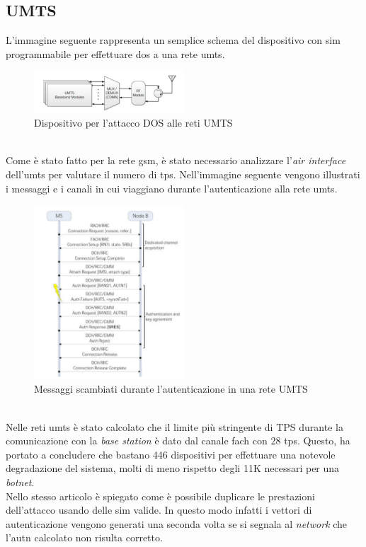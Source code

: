 \subsection{UMTS}
L'immagine seguente rappresenta un semplice schema del dispositivo con \gls{sim} programmabile per effettuare \gls{dos} a una rete \gls{umts}\cite{umts-dos}.
\begin{figure}[h]
    \centering
    \includegraphics[width=0.5\textwidth]{images/umts-dos-device.png}
    \caption{Dispositivo per l'attacco DOS alle reti UMTS\cite{umts-dos}}
\end{figure}\\
Come è stato fatto per la rete \gls{gsm}, è stato necessario analizzare l'\textit{air interface} dell'\gls{umts} per valutare il numero di \gls{tps}.
Nell'immagine seguente vengono illustrati i messaggi e i canali in cui viaggiano durante l'autenticazione alla rete \gls{umts}.
\begin{figure}[h]
    \centering
    \includegraphics[width=0.5\textwidth]{images/umts-air-channel.png}
    \caption{Messaggi scambiati durante l'autenticazione in una rete UMTS\cite{umts-dos}}
\end{figure}\\
Nelle reti \gls{umts} è stato calcolato che il limite più stringente di TPS durante la comunicazione con la \textit{base station} è dato dal canale \gls{fach} con 28 \gls{tps}.
Questo, ha portato a concludere che bastano 446 dispositivi per effettuare una notevole degradazione del sistema, molti di meno rispetto degli 11K necessari per una \textit{botnet}\cite{dos-imsi}.\\
Nello stesso articolo è spiegato come è possibile duplicare le prestazioni dell'attacco usando delle \gls{sim} valide. In questo modo infatti i vettori di autenticazione vengono generati una seconda volta se si segnala al
\textit{network} che l'\gls{autn} calcolato non risulta corretto.
